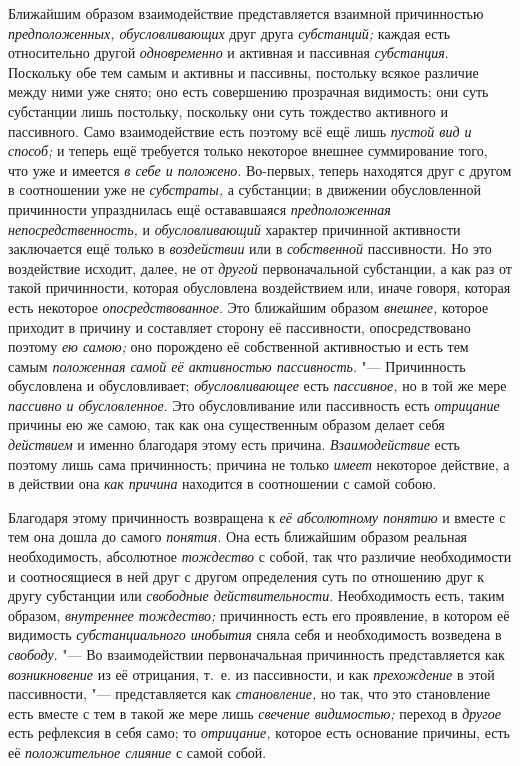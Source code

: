 Ближайшим образом взаимодействие представляется взаимной причинностью
{\em предположенных, обусловливающих} друг друга
{\em субстанций;} каждая есть относительно другой
{\em одновременно} и активная и пассивная
{\em субстанция}. Поскольку обе тем самым и активны и
пассивны, постольку всякое различие между ними уже снято; оно есть
совершению прозрачная видимость; они суть субстанции лишь постольку,
поскольку они суть тождество активного и пассивного. Само взаимодействие
есть поэтому всё ещё лишь {\em пустой вид и способ;} и
теперь ещё требуется только некоторое внешнее суммирование того, что уже и
имеется {\em в себе и положено}. Во-первых, теперь
находятся друг с другом в соотношении уже не
{\em субстраты,} а субстанции; в движении обусловленной
причинности упразднилась ещё остававшаяся
{\em предположенная непосредственность,} и
{\em обусловливающий} характер причинной активности
заключается ещё только в {\em воздействии} или в
{\em собственной} пассивности. Но это воздействие
исходит, далее, не от {\em другой} первоначальной
субстанции, а как раз от такой причинности, которая обусловлена
воздействием или, иначе говоря, которая есть некоторое
{\em опосредствованное}. Это ближайшим образом
{\em внешнее,} которое приходит в причину и составляет
сторону её пассивности, опосредствовано поэтому {\em ею
самою;} оно порождено её собственной активностью и есть тем самым
{\em положенная самой её активностью пассивность}. "---
Причинность обусловлена и обусловливает; {\em обусловливающее} есть
{\em пассивное,} но в той же мере
{\em пассивно и обусловленное}. Это обусловливание или
пассивность есть {\em отрицание} причины ею же самою,
так как она существенным образом делает себя
{\em действием} и именно благодаря этому есть причина.
{\em Взаимодействие} есть поэтому лишь сама
причинность; причина не только {\em имеет} некоторое
действие, а в действии она {\em как причина} находится
в соотношении с самой собою.

Благодаря этому причинность возвращена к {\em её
абсолютному понятию} и вместе с тем она дошла до самого
{\em понятия}. Она есть ближайшим образом реальная
необходимость, абсолютное {\em тождество} с собой, так
что различие необходимости и соотносящиеся в ней друг с другом определения
суть по отношению друг к другу субстанции или
{\em свободные действительности}. Необходимость есть,
таким образом, {\em внутреннее тождество;} причинность
есть его проявление, в котором её видимость
{\em субстанциального инобытия} сняла себя и
необходимость возведена в {\em свободу}. "--- Во
взаимодействии первоначальная причинность представляется как
{\em возникновение} из её отрицания, т.~е. из
пассивности, и как {\em прехождение} в этой
пассивности, "--- представляется как {\em становление,} но
так, что это становление есть вместе с тем в такой же мере лишь
{\em свечение видимостью;} переход в
{\em другое} есть рефлексия в себя само; то
{\em отрицание,} которое есть основание причины, есть
её {\em положительное слияние} с самой собой.

